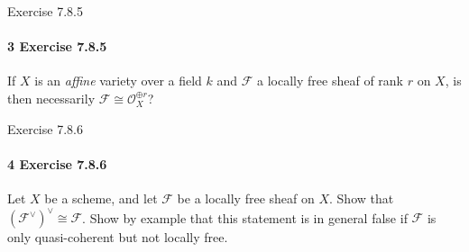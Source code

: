 \documentclass[12pt]{article}
\newlength{\myparskip}
\newenvironment{fullbox}{\begin{lrbox}{\savefullbox}\begin{minipage}{\dimexpr\textwidth-2\fboxsep\relax}\setlength{\parskip}{\myparskip}}{\end{minipage}\end{lrbox}\framebox[\textwidth]{\usebox{\savefullbox}}}
\newenvironment{pbox}[1][]{\begin{fullbox}\ifx#1\empty\else\paragraph{#1}\phantom{}\fi}{\end{fullbox}}
\theoremstyle{definition}
\newcommand{\<}{\langle}
\renewcommand{\>}{\rangle}
\newcommand{\isom}{\cong}
\newcommand{\OO}{\mathcal{O}}
\newcommand{\FF}{\mathcal{F}}
\begin{document}
\newpage
\begin{pbox}[3 Exercise 7.8.5]
    If $X$ is an \textit{affine} variety over a field $k$ and $\FF$ a locally free sheaf of rank $r$ on $X$, is then necessarily $\FF \isom \OO_X^{\oplus r}$?
\end{pbox}

\begin{pbox}[4 Exercise 7.8.6]
    Let $X$ be a scheme, and let $\FF$ be a locally free sheaf on $X$.
    Show that $(\FF^\vee)^\vee \isom \FF$.
    Show by example that this statement is in general false if $\FF$ is only quasi-coherent but not locally free.
\end{pbox}
\end{document}
